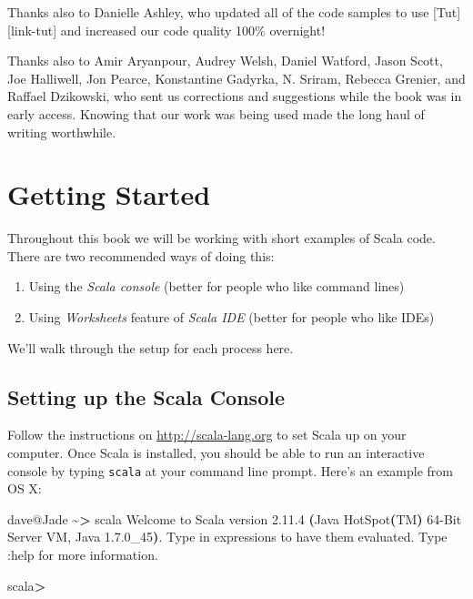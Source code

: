\documentclass[11pt,a5paper,]{book}
\newenvironment{Shaded}{\begin{snugshade}}{\end{snugshade}}
\newcommand{\BuiltInTok}[1]{#1}
\newcommand{\ErrorTok}[1]{\textcolor[rgb]{0.64,0.00,0.00}{\textbf{#1}}}
\newcommand{\ExtensionTok}[1]{#1}
\newcommand{\KeywordTok}[1]{\textcolor[rgb]{0.13,0.29,0.53}{\textbf{#1}}}
\newcommand{\NormalTok}[1]{#1}
\newcommand{\OperatorTok}[1]{\textcolor[rgb]{0.81,0.36,0.00}{\textbf{#1}}}
\begin{document}
Thanks also to Danielle Ashley, who updated all of the code samples to
use {[}Tut{]}{[}link-tut{]} and increased our code quality 100\%
overnight!

Thanks also to Amir Aryanpour, Audrey Welsh, Daniel Watford, Jason
Scott, Joe Halliwell, Jon Pearce, Konstantine Gadyrka, N. Sriram,
Rebecca Grenier, and Raffael Dzikowski, who sent us corrections and
suggestions while the book was in early access. Knowing that our work
was being used made the long haul of writing worthwhile.

\hypertarget{getting-started}{%
\chapter{Getting Started}\label{getting-started}}

Throughout this book we will be working with short examples of Scala
code. There are two recommended ways of doing this:

\begin{enumerate}
\def\labelenumi{\arabic{enumi}.}
\item
  Using the \emph{Scala console} (better for people who like command
  lines)
\item
  Using \emph{Worksheets} feature of \emph{Scala IDE} (better for people
  who like IDEs)
\end{enumerate}

We'll walk through the setup for each process here.

\hypertarget{setting-up-the-scala-console}{%
\section{Setting up the Scala
Console}\label{setting-up-the-scala-console}}

Follow the instructions on \url{http://scala-lang.org} to set Scala up
on your computer. Once Scala is installed, you should be able to run an
interactive console by typing \texttt{scala} at your command line
prompt. Here's an example from OS X:

\begin{Shaded}
\begin{Highlighting}[]
\ExtensionTok{dave@Jade}\NormalTok{ \textasciitilde{}}\OperatorTok{\textgreater{}}\NormalTok{ scala}
\ExtensionTok{Welcome}\NormalTok{ to Scala version 2.11.4 }\ErrorTok{(}\ExtensionTok{Java}\NormalTok{ HotSpot}\ErrorTok{(}\ExtensionTok{TM}\KeywordTok{)} \ExtensionTok{64{-}Bit}\NormalTok{ Server VM, Java 1.7.0\_45}\KeywordTok{)}\BuiltInTok{.}
\ExtensionTok{Type}\NormalTok{ in expressions to have them evaluated.}
\ExtensionTok{Type}\NormalTok{ :help for more information.}

\ExtensionTok{scala}\OperatorTok{\textgreater{}}
\end{Highlighting}
\end{Shaded}
\end{document}
